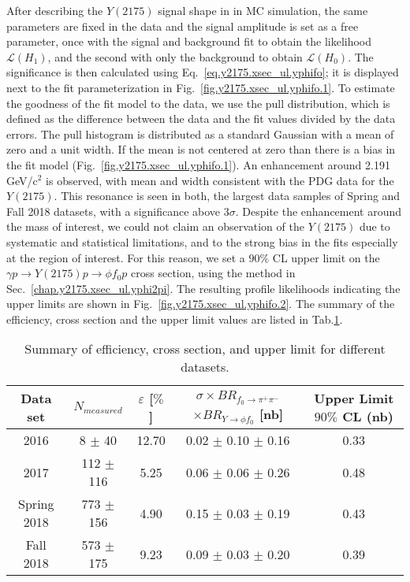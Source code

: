 After describing the $Y(2175)$ signal shape in in MC simulation, the same parameters are fixed in the data and the signal amplitude is set as a free parameter, once with the signal and background fit to obtain the likelihood $\mathcal{L}(H_{1})$, and the second with only the background to obtain $\mathcal{L}(H_{0})$. The significance is then calculated using Eq.~\ref{eq.y2175.xsec_ul.yphifo}; it is displayed next to the fit parameterization in Fig.~\ref{fig.y2175.xsec_ul.yphifo.1}. To estimate the goodness of the fit model to the data, we use the pull distribution, which is defined as the difference between the data and the fit values divided by the data errors. The pull histogram is distributed as a standard Gaussian with a mean of zero and a unit width. If the mean is not centered at zero than there is a bias in the fit model (Fig.~\ref{fig.y2175.xsec_ul.yphifo.1}). An enhancement around 2.191 GeV/c$^2$ is observed, with mean and width consistent with the PDG data for the $Y(2175)$. This resonance is seen in both, the largest data samples of Spring and Fall 2018 datasets, with a significance above 3$\sigma$. Despite the enhancement around the mass of interest, we could not claim an observation of the $Y(2175)$ due to systematic and statistical limitations, and to the strong bias in the fits especially at the region of interest. For this reason, we set a $90\%$ CL upper limit on the $\gamma p \rightarrow Y(2175) p \rightarrow \phi f_0 p$ cross section, using the method in Sec.~\ref{chap.y2175.xsec_ul.yphi2pi}. The resulting profile likelihoods indicating the upper limits are shown in Fig.~\ref{fig.y2175.xsec_ul.yphifo.2}. The summary of the efficiency, cross section and the upper limit values are listed in Tab.\ref{tab.y2175.xsec_ul.yphifo}.

\begin{center}
    \null
    \vfill
    \begin{table}[htbp]
        \centering
        \caption{Summary of efficiency, cross section, and upper limit for different datasets.}
        \label{tab.y2175.xsec_ul.yphifo}
        \begin{tabular}{|c|c|c|c|c|}
            \hline
            Data set & $N_{measured}$ & $\varepsilon$ [$\%$] & $\sigma \times BR_{f_{0}\rightarrow\pi^{+}\pi^{-}}$ $\times BR_{Y\rightarrow \phi f_0}$ [nb] & \thead{Upper Limit\\$90\%$ CL (nb)}\\
            \hline
            2016 & 8 $\pm$ 40 & 12.70 & 0.02 $\pm$ 0.10 $\pm$ 0.16 & 0.33 \\
            2017 & 112 $\pm$ 116 & 5.25 & 0.06 $\pm$ 0.06 $\pm$ 0.26 & 0.48 \\
            Spring 2018 & 773 $\pm$ 156 & 4.90 & 0.15 $\pm$ 0.03 $\pm$ 0.19 & 0.43 \\
            Fall 2018 & 573 $\pm$ 175 & 9.23 & 0.09 $\pm$ 0.03 $\pm$ 0.20 & 0.39 \\
            \hline
        \end{tabular}
    \end{table}
    \null
    \vfill
\end{center}

